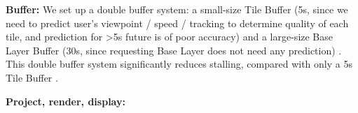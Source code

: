 \textbf{Buffer: } We set up a double buffer system: a small-size Tile Buffer (5s, since we need to predict user's viewpoint / speed / tracking to determine quality of each tile, and prediction for >5s future is of poor accuracy) and a large-size Base Layer Buffer (30s, since requesting Base Layer does not need any prediction) \cite{buffer}. This double buffer system significantly reduces stalling, compared with only a 5s Tile Buffer \cite{Flare}.

\textbf{Project, render, display: }